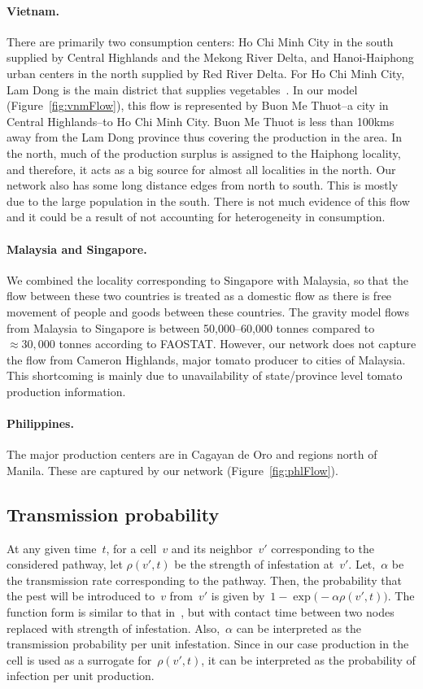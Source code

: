 \documentclass[10pt]{article}
\newcommand{\infest}{\rho}
\theoremstyle{definition}
\begin{document}
\paragraph{Vietnam.}
There are primarily two consumption centers: Ho Chi Minh City in the south
supplied by Central Highlands and the Mekong River Delta, and
Hanoi-Haiphong urban centers in the north supplied by Red River Delta. For
Ho Chi Minh City, Lam Dong is the main district that supplies
vegetables~\cite{cadilhon2006}.  In our model (Figure~\ref{fig:vnmFlow}),
this flow is represented by Buon Me Thuot--a city in Central Highlands--to
Ho Chi Minh City. Buon Me Thuot is less than 100kms away from the Lam Dong
province thus covering the production in the area. In the north, much of
the production surplus is assigned to the Haiphong locality, and therefore,
it acts as a big source for almost all localities in the north. Our network
also has some long distance edges from north to south. This is mostly due
to the large population in the south. There is not much evidence of this
flow and it could be a result of not accounting for heterogeneity in
consumption.
\paragraph{Malaysia and Singapore.} We combined the locality corresponding
to Singapore with Malaysia, so that the flow between these two countries is
treated as a domestic flow as there is free movement of people and goods
between these countries. The gravity model flows from Malaysia to Singapore
is between 50,000--60,000 tonnes compared to $\approx30,000$ tonnes
according to FAOSTAT. However, our network does not capture the flow from
Cameron Highlands, major tomato producer to cities of Malaysia. This
shortcoming is mainly due to unavailability of state/province level tomato
production information.
\paragraph{Philippines.} The major production centers are in Cagayan de Oro
and regions north of Manila. These are captured by our network
(Figure~\ref{fig:phlFlow}).

\subsection{Transmission probability}\label{trans}
At any given time~$t$, for a cell~$v$ and its neighbor~$v'$ corresponding
to the considered pathway, let $\infest(v',t)$ be the strength of
infestation at~$v'$. Let,~$\alpha$ be the transmission rate corresponding
to the pathway. Then, the probability that the pest will be introduced
to~$v$ from~$v'$ is given by~$1-\exp\big(-\alpha\infest(v',t)\big)$. The
function form is similar to that in~\cite{newman2002spread,meyers2007}, but with
contact time between two nodes replaced with strength of infestation. Also,~$\alpha$ can be interpreted as the transmission probability
per unit infestation. Since in our case production in the cell is used as a
surrogate for~$\infest(v',t)$, it can be interpreted as the
probability of infection per unit production. \\
\end{document}
